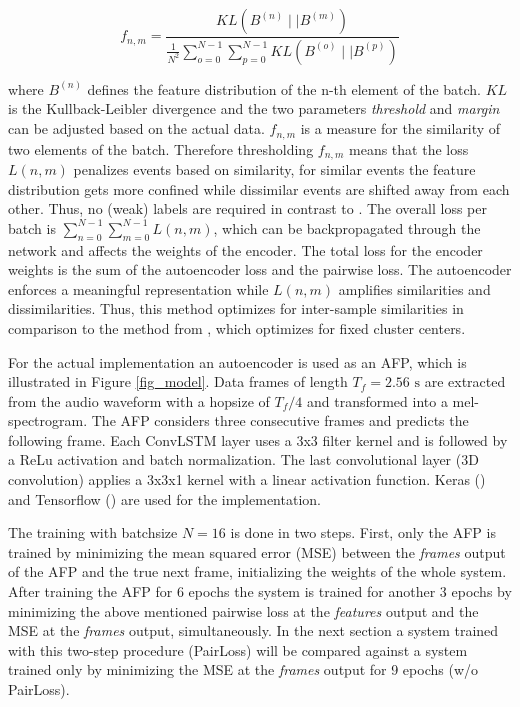 \documentclass{article} %
\begin{document}
\begin{equation}
f_{ n,m } = \frac{{KL(B^{(n)} \mid\mid B^{(m)})}}  {\frac{1}{N^2}{\sum_{o=0}^{N-1} \sum_{p=0}^{N-1} KL(B^{(o)} \mid\mid B^{(p)})}} 
\end{equation}

where $B^{(n)}$ defines the feature distribution of the n-th element of the batch. $KL$ is the Kullback-Leibler divergence and the two parameters \emph{threshold} and \emph{margin} can be adjusted based on the actual data. $f_{n,m}$ is a measure for the similarity of two elements of the batch. Therefore thresholding $f_{n,m}$ means that the loss $L(n,m)$ penalizes events based on similarity, for similar events the feature distribution gets more confined while dissimilar events are shifted away from each other. Thus, no (weak) labels are required in contrast to \cite{hsu_neural_2015}. The overall loss per batch is $\sum_{n=0}^{N-1} \sum_{m=0}^{N-1} L(n,m)$, which can be backpropagated through the network and affects the weights of the encoder. The total loss for the encoder weights is the sum of the autoencoder loss and the pairwise loss. The autoencoder enforces a meaningful representation while $L(n,m)$ amplifies similarities and dissimilarities. Thus, this method optimizes for inter-sample similarities in comparison to the method from \cite{xie_unsupervised_2016}, which optimizes for fixed cluster centers.

For the actual implementation an autoencoder is used as an AFP, which is illustrated in Figure \ref{fig_model}. Data frames of length $T_f=2.56\text{ s}$ are extracted from the audio waveform with a hopsize of $T_f/4$ and transformed into a mel-spectrogram. The AFP considers three consecutive frames and predicts the following frame.
Each ConvLSTM layer uses a 3x3 filter kernel and is followed by a ReLu activation and batch normalization. The last convolutional layer (3D convolution) applies a 3x3x1 kernel with a linear activation function. Keras (\cite{chollet_keras_2015}) and Tensorflow (\cite{martin_abadi_tensorflow:_2015}) are used for the implementation.

The training with batchsize $N=16$ is done in two steps. First, only the AFP is trained by minimizing the mean squared error (MSE) between the \emph{frames} output of the AFP and the true next frame, initializing the weights of the whole system. After training the AFP for 6 epochs the system is trained for another 3 epochs by minimizing the above mentioned pairwise loss at the \emph{features} output and the MSE at the \emph{frames} output, simultaneously. In the next section a system trained with this two-step procedure (PairLoss) will be compared against a system trained only by minimizing the MSE at the \emph{frames} output for 9 epochs (w/o PairLoss).
\end{document}
